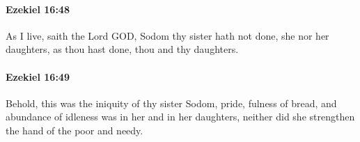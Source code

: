 		\paragraph{Ezekiel 16:48} %
			\label{EZEKIEL-16-48}

			As I live, saith the Lord GOD, Sodom thy sister hath not done, she nor her daughters, as thou hast done, thou and thy daughters.


		\paragraph{Ezekiel 16:49} %
			\label{EZEKIEL-16-49}

			Behold, this was the iniquity of thy sister Sodom, pride, fulness of bread, and abundance of idleness was in her and in her daughters, neither did she strengthen the hand of the poor and needy.


